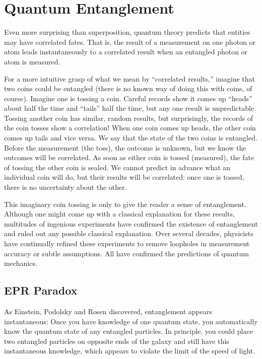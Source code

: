 \documentclass[11pt]{article}
\begin{document}
\section{Quantum Entanglement}
Even more surprising than superposition, quantum theory predicts that entities may have correlated fates. That is, the result of a measurement on one photon or atom leads instantaneously to a correlated result when an entangled photon or atom is measured.

For a more intuitive grasp of what we mean by “correlated results,” imagine that two coins could be entangled (there is no known way of doing this with coins, of course). Imagine one is tossing a coin. Careful records show it comes up “heads” about half the time and “tails” half the time, but any one result is unpredictable. Tossing another coin has similar, random results, but surprisingly, the records of the coin tosses show a correlation! When one coin comes up heads, the other coin comes up tails and vice versa. We say that the state of the two coins is entangled. Before the measurement (the toss), the outcome is unknown, but we know the outcomes will be correlated. As soon as either coin is tossed (measured), the fate of tossing the other coin is sealed. We cannot predict in advance what an individual coin will do, but their results will be correlated: once one is tossed, there is no uncertainty about the other.

This imaginary coin tossing is only to give the reader a sense of entanglement. Although one might come up with a classical explanation for these results, multitudes of ingenious experiments have confirmed the existence of entanglement and ruled out any possible classical explanation. Over several decades, physicists have continually refined these experiments to remove loopholes in measurement accuracy or subtle assumptions. All have confirmed the predictions of quantum mechanics.

\subsection{EPR Paradox}
As Einstein, Podolsky and Rosen discovered, entanglement appears instantaneous: Once you have knowledge of one quantum state, you automatically know the quantum state of any entangled particles. In principle, you could place two entangled particles on opposite ends of the galaxy and still have this instantaneous knowledge, which appears to violate the limit of the speed of light.\\
\end{document}
